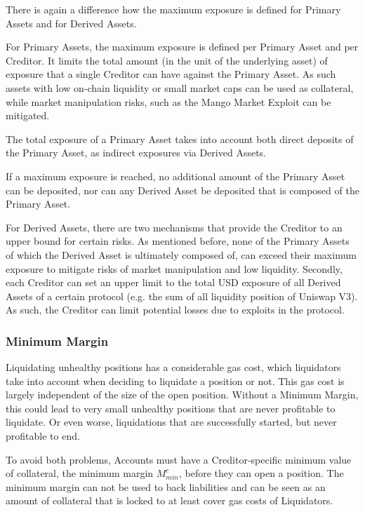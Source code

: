 \documentclass[sigconf,nonacm]{acmart}
\begin{document}
There is again a difference how the maximum exposure is defined for Primary Assets and for Derived Assets.

For Primary Assets, the maximum exposure is defined per Primary Asset and per Creditor.
It limits the total amount (in the unit of the underlying asset) of exposure that a single Creditor can have against the Primary Asset.
As such assets with low on-chain liquidity or small market caps can be used as collateral,
while market manipulation risks, such as the Mango Market Exploit\cite{coindeskDeFiExchange} can be mitigated.

The total exposure of a Primary Asset takes into account both direct deposits of the Primary Asset, as indirect exposures via Derived Assets.

If a maximum exposure is reached, no additional amount of the Primary Asset can be deposited,
nor can any Derived Asset be deposited that is composed of the Primary Asset.

For Derived Assets, there are two mechanisms that provide the Creditor to an upper bound for certain risks.
As mentioned before, none of the Primary Assets of which the Derived Asset is ultimately composed of, can exceed their maximum exposure to mitigate risks of market manipulation and low liquidity.
Secondly, each Creditor can set an upper limit to the total USD exposure of all Derived Assets of a certain protocol (e.g. the sum of all liquidity position of Uniswap V3).
As such, the Creditor can limit potential losses due to exploits in the protocol.

\subsubsection{Minimum Margin}
\label{subsubsec:minimum-margin}
Liquidating unhealthy positions has a considerable gas cost, which liquidators take into account when deciding to liquidate a position or not.
This gas cost is largely independent of the size of the open position.
Without a Minimum Margin, this could lead to very small unhealthy positions that are never profitable to liquidate.
Or even worse, liquidations that are successfully started, but never profitable to end.

To avoid both problems, Accounts must have a Creditor-specific minimum value of collateral, the minimum margin $M_{min}^c$, before they can open a position.
The minimum margin can not be used to back liabilities and can be seen as an amount of collateral that is locked to at least cover gas costs of Liquidators.
\end{document}
